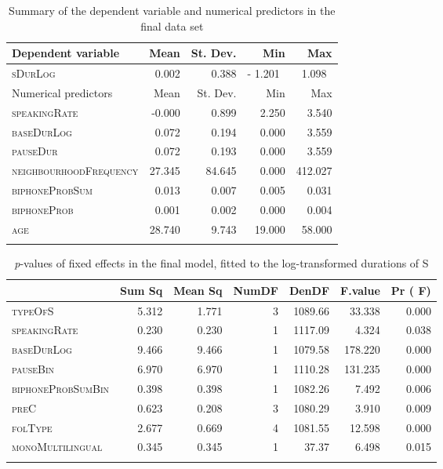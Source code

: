 \begin{table}[H]\fontsize{10}{11}
\caption{Summary of the dependent variable and numerical predictors in the final data set}
\label{tab:4.3}
\centering
\begin{tabular}{lrrrr} 
\lsptoprule
Dependent variable     & Mean   & St. Dev. & Min        & Max      \\ 
\midrule
\textsc{sDurLog}                & 0.002  & 0.388    & -
  1.201~ & 1.098~   \\ 
\midrule
Numerical predictors   & Mean   & St. Dev. & Min        & Max      \\ 
\midrule
\textsc{speakingRate}           & -0.000 & 0.899    & 2.250      & 3.540    \\
\textsc{baseDurLog}             & 0.072  & 0.194    & 0.000      & 3.559    \\
\textsc{pauseDur}               & 0.072  & 0.193    & 0.000      & 3.559    \\
\textsc{neighbourhoodFrequency} & 27.345 & 84.645   & 0.000      & 412.027  \\
\textsc{biphoneProbSum}         & 0.013  & 0.007    & 0.005      & 0.031    \\
\textsc{biphoneProb}            & 0.001  & 0.002    & 0.000      & 0.004    \\
\textsc{age}                    & 28.740 & 9.743    & 19.000     & 58.000   \\
\lspbottomrule
\end{tabular}
\end{table}




\begin{table}[H]\fontsize{10}{11}
\caption{\textit{p}-values of fixed effects in the final model, fitted to the log-transformed durations of S}
\label{tab:4.4}
\centering
\begin{tabular}{lrrrrrr} 
\lsptoprule
~                 & Sum Sq & Mean Sq & NumDF & DenDF   & F.value & Pr ( F)  \\ 
\midrule
\textsc{typeOfS}           & 5.312  & 1.771   & 3     & 1089.66 & 33.338  & 0.000    \\
\textsc{speakingRate}      & 0.230  & 0.230   & 1     & 1117.09 & 4.324   & 0.038    \\
\textsc{baseDurLog}        & 9.466  & 9.466   & 1     & 1079.58 & 178.220 & 0.000    \\
\textsc{pauseBin}          & 6.970  & 6.970   & 1     & 1110.28 & 131.235 & 0.000    \\
\textsc{biphoneProbSumBin} & 0.398  & 0.398   & 1     & 1082.26 & 7.492   & 0.006    \\
\textsc{preC}              & 0.623  & 0.208   & 3     & 1080.29 & 3.910   & 0.009    \\
\textsc{folType}           & 2.677  & 0.669   & 4     & 1081.55 & 12.598  & 0.000    \\
\textsc{monoMultilingual}  & 0.345  & 0.345   & 1     & 37.37   & 6.498   & 0.015    \\
\lspbottomrule
\end{tabular}
\end{table}




